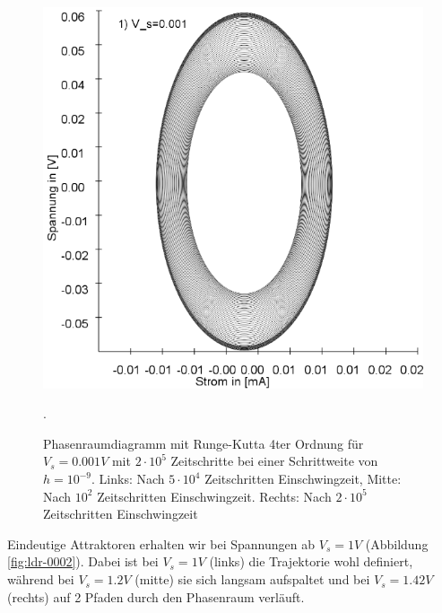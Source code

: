 \documentclass{scrartcl}
\begin{document}
\begin{figure}
\includegraphics[scale=0.28]{schwing-runge-nach200k-weitere200k-10-9}
\caption{Phasenraumdiagramm mit Runge-Kutta 4ter Ordnung für $V_s=0.001V$ mit $2\cdot10^5$ Zeitschritte bei einer Schrittweite von $h=10^{-9}$. Links: Nach $5\cdot10^4$ Zeitschritten Einschwingzeit, Mitte: Nach $10^2$ Zeitschritten Einschwingzeit. Rechts: Nach $2\cdot10^5$ Zeitschritten Einschwingzeit}. 
\label{fig:ldr-0001}
\end{figure}
Eindeutige Attraktoren erhalten wir bei Spannungen ab $V_s=1V$ (Abbildung \ref{fig:ldr-0002}). Dabei ist bei $V_s=1V$ (links) die Trajektorie wohl definiert, während bei $V_s=1.2V$ (mitte) sie sich langsam aufspaltet und bei $V_s=1.42V$ (rechts) auf 2 Pfaden durch den Phasenraum verläuft.
\end{document}
